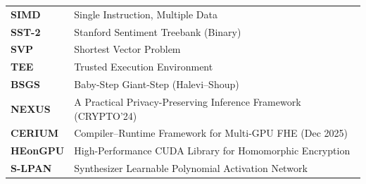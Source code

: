 \begin{tabular}{@{}p{3cm}p{11.5cm}@{}}
\textbf{SIMD}  & Single Instruction, Multiple Data \\
\textbf{SST-2} & Stanford Sentiment Treebank (Binary) \\
\textbf{SVP}   & Shortest Vector Problem \\
\textbf{TEE}   & Trusted Execution Environment \\
\textbf{BSGS}  & Baby-Step Giant-Step (Halevi--Shoup) \\
\textbf{NEXUS} & A Practical Privacy-Preserving Inference Framework (CRYPTO'24) \\
\textbf{CERIUM}& Compiler--Runtime Framework for Multi-GPU FHE (Dec 2025) \\
\textbf{HEonGPU} & High-Performance CUDA Library for Homomorphic Encryption \\
\textbf{S-LPAN} & Synthesizer Learnable Polynomial Activation Network \\
\end{tabular}